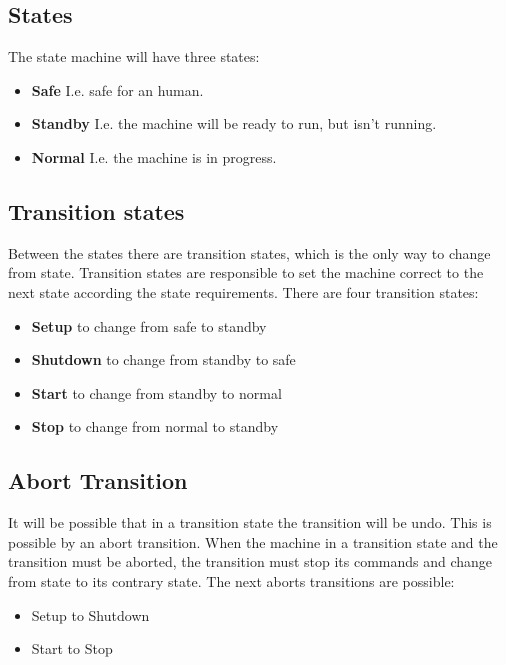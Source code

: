 \documentclass[12pt,a4paper]{report}
\begin{document}
\subsection{States}
The state machine will have three states:
\begin{itemize}
\item \textbf{Safe} I.e. safe for an human.
\item \textbf{Standby} I.e. the machine will be ready to run, but isn’t running.
\item \textbf{Normal} I.e. the machine is in progress.
\end{itemize}
\newpage
\subsection{Transition states}
Between the states there are transition states, which is the only way to change from state. Transition states are responsible to set the machine correct to the next state according the state requirements.  
There are four transition states:
\begin{itemize}
\item \textbf{Setup} to change from safe to standby
\item \textbf{Shutdown} to change from standby to safe
\item \textbf{Start} to change from standby to normal
\item \textbf{Stop} to change from normal to standby
\end{itemize}

\subsection{Abort Transition}
It will be possible that in a transition state the transition will be undo. This is possible by an abort transition. When the machine in a transition state and the transition must be aborted, the transition must stop its commands and change from state to its contrary state. 
The next aborts transitions are possible:
\begin{itemize}
\item Setup to Shutdown
\item Start to Stop
\end{itemize}
\end{document}
